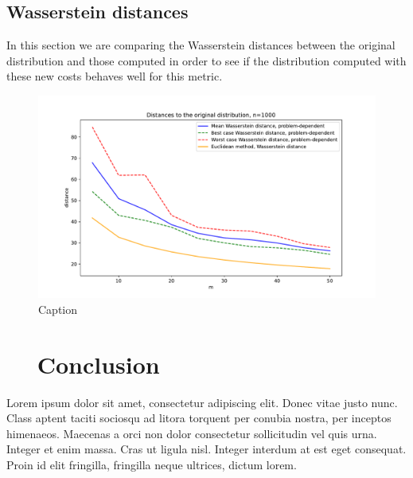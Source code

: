 \documentclass{amsart}
\begin{document}
\subsection{Wasserstein distances}
In this section we are comparing the Wasserstein distances between the original distribution and those computed in order to see if the distribution computed with these new costs behaves well for this metric.
\begin{figure}
    \centering
    \includegraphics[width=0.5\linewidth]{plots/distance problem and euc.pdf}
    \caption{Caption}
    \label{fig:enter-label}
\end{figure}
\section{$\quad$ Conclusion}
Lorem ipsum dolor sit amet, consectetur adipiscing elit. Donec vitae justo nunc. Class aptent taciti sociosqu ad litora torquent per conubia nostra, per inceptos himenaeos. Maecenas a orci non dolor consectetur sollicitudin vel quis urna. Integer et enim massa. Cras ut ligula nisl. Integer interdum at est eget consequat. Proin id elit fringilla, fringilla neque ultrices, dictum lorem.

\clearpage


\clearpage
\end{document}
